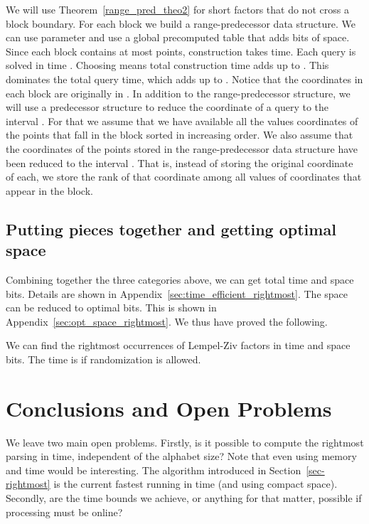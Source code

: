 \documentclass[11pt,runningheads]{llncs}
\begin{document}
{We will use Theorem~\ref{range_pred_theo2} for short factors 
that do not cross a block boundary. 
For each block we build a range-predecessor data structure. 
We can use parameter  and use a global precomputed table that adds 
 bits of space. Since each block contains at most
 points, construction takes 
 time. 
Each query is solved in time . 
Choosing  means total construction time 
adds up to .
This dominates the total query time, which adds up to 
. 
Notice that the  coordinates in each block are originally in . 
In addition to the range-predecessor structure, we will use a predecessor 
structure to reduce the  coordinate of a query to the interval . 
For that we assume that we have available all the
values  coordinates of the points that fall in the block sorted 
in increasing order. We also assume that the  coordinates 
of the points stored in the range-predecessor data structure have been reduced  
to the interval . That is, instead of storing the original  coordinate
of each, we store the rank of that coordinate among all values of  coordinates 
that appear in the block. 

\subsection{Putting pieces together and getting optimal space}
\label{sec:full_picture_and_opt_space}
Combining together the three categories above, we can get 
total time  and space  bits. Details 
are shown in Appendix~\ref{sec:time_efficient_rightmost}. 
The space can be reduced to optimal  bits. 
This is shown in Appendix~\ref{sec:opt_space_rightmost}. 
We thus have proved the following.
\begin{theorem}
We can find the rightmost occurrences of Lempel-Ziv factors in 
time  and space  
bits. The time is  if randomization 
is allowed. 
\end{theorem}

\section{Conclusions and Open Problems}
\label{sec-conclusion}

We leave two main open problems. Firstly, is it possible to compute the rightmost parsing
in  time, independent of the alphabet size? Note that even using  memory 
and  time would be interesting. The algorithm introduced in Section~\ref{sec-rightmost} 
is the current fastest running in  time (and using 
compact space). Secondly, are the time bounds we achieve, or anything  for 
that matter, possible if processing must be online?

}
\end{document}
